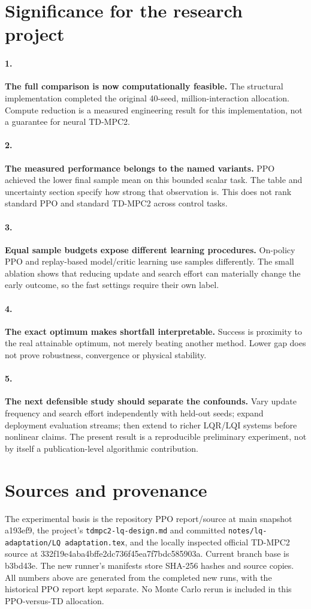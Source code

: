 \documentclass[11pt]{article}
\begin{document}
\section{Significance for the research project}

\paragraph{1.} \textbf{The full comparison is now computationally feasible.} The structural implementation completed the original 40-seed, million-interaction allocation. Compute reduction is a measured engineering result for this implementation, not a guarantee for neural TD-MPC2.
\paragraph{2.} \textbf{The measured performance belongs to the named variants.} PPO achieved the lower final sample mean on this bounded scalar task. The table and uncertainty section specify how strong that observation is. This does not rank standard PPO and standard TD-MPC2 across control tasks.
\paragraph{3.} \textbf{Equal sample budgets expose different learning procedures.} On-policy PPO and replay-based model/critic learning use samples differently. The small ablation shows that reducing update and search effort can materially change the early outcome, so the fast settings require their own label.
\paragraph{4.} \textbf{The exact optimum makes shortfall interpretable.} Success is proximity to the real attainable optimum, not merely beating another method. Lower gap does not prove robustness, convergence or physical stability.
\paragraph{5.} \textbf{The next defensible study should separate the confounds.} Vary update frequency and search effort independently with held-out seeds; expand deployment evaluation streams; then extend to richer LQR/LQI systems before nonlinear claims. The present result is a reproducible preliminary experiment, not by itself a publication-level algorithmic contribution.

\section{Sources and provenance}

The experimental basis is the repository PPO report/source at main snapshot a193ef9, the project's \texttt{tdmpc2-lq-design.md} and committed \texttt{notes/lq-adaptation/LQ adaptation.tex}, and the locally inspected official TD-MPC2 source at 332f19e4aba4bffe2dc736f45ea7f7bdc585903a. Current branch base is b3bd43e. The new runner's manifests store SHA-256 hashes and source copies. All numbers above are generated from the completed new runs, with the historical PPO report kept separate. No Monte Carlo rerun is included in this PPO-versus-TD allocation.
\end{document}
